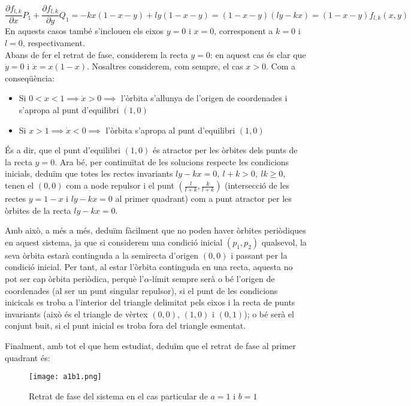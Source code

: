 \documentclass{article}
\begin{document}
$$\frac{\partial f_{l,k}}{\partial x}P_1+\frac{\partial f_{l,k}}{\partial y}Q_1=-kx(1-x-y)+ly(1-x-y)=(1-x-y)(ly-kx)=(1-x-y)f_{l,k}(x,y)$$
En aquests casos també s'inclouen els eixos $y=0$ i $x=0$, corresponent a $k=0$ i $l=0$, respectivament.
\\ 
Abans de fer el retrat de fase, considerem la recta $y=0$: en aquest cas és clar que $\dot{y}=0$ i $\dot{x}=x(1-x)$. Nosaltres considerem, com sempre, el cas $x>0$. Com a conseqüència:
\begin{itemize}
  \item Si $0<x<1 \implies \dot{x}>0 \implies $ l'òrbita s'allunya de l'origen de coordenades i s'apropa al punt d'equilibri $(1, 0)$
  \item Si $x>1 \implies \dot{x}<0 \implies $ l'òrbita s'apropa al punt d'equilibri $(1, 0)$
\end{itemize}
És a dir, que el punt d'equilibri $(1,0)$ és atractor per les òrbites dels punts de la recta $y=0$. Ara bé, per continuïtat de les solucions respecte les condicions inicials, deduïm que totes les rectes invariants $ly-kx=0, \ l+k>0, \ lk\geq 0$, tenen el $(0,0)$ com a node repulsor i el punt $(\frac{l}{l+k}, \frac{k}{l+k})$ (intersecció de les rectes $y=1-x$ i $ly-kx=0$ al primer quadrant) com a punt atractor per les òrbites de la recta $ly-kx=0$. 

Amb  això, a més a més, deduïm fàcilment que no poden haver òrbites periòdiques en aquest sistema, ja que si considerem una condició inicial $(p_1, p_2)$ qualsevol, la seva òrbita estarà continguda a la semirecta d'origen $(0,0)$ i passant per la condició inicial. Per tant, al estar l'òrbita continguda en una recta, aquesta no pot ser cap òrbita periòdica, perquè l'$\alpha$-límit sempre serà o bé l'origen de coordenades (al ser un punt singular repulsor), si el punt de les condicions inicicals es troba a l'interior del triangle delimitat pels eixos i la recta de punts invariants (això és el triangle de vèrtex $(0,0)$, $(1,0)$ i $(0,1)$); o bé serà el conjunt buit, si el punt inicial es troba fora del triangle esmentat. 
\par Finalment, amb tot el que hem estudiat, deduïm que el retrat de fase al primer quadrant és:
\begin{comment}
\begin{center}
  \begin{tikzpicture}[scale=1.6]
    \draw (0,0)-- (0,3) node[thick, above]{\tiny{$x=0$}};
    \draw (0,0)--(3,0) node[thick,below]{\tiny{$y=0$}};
    \node at (0,0) {\textbullet};
    \node[below right] at (0,0){\tiny{$(0,0)$}};
    
    \draw (1, 0)-- (0,1)
  \end{tikzpicture}
\end{center}
\end{comment}
\begin{figure}[h]
  \begin{center}
    \texttt{[image: a1b1.png]}
    \caption{Retrat de fase del sistema en el cas particular de $a=1$ i $b=1$}
  \end{center}
\end{figure}
\newpage
\end{document}
